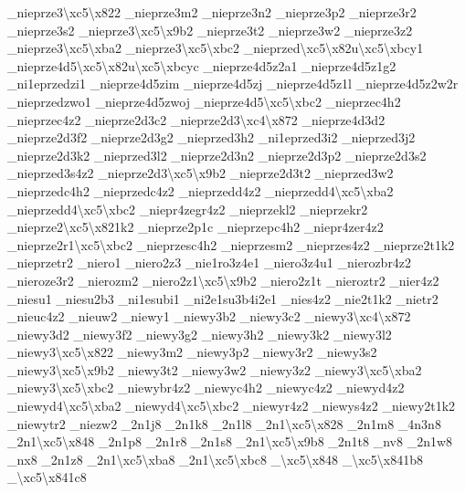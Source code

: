 {\-\_\-nieprze3\textbackslash{}xc5\textbackslash{}x822 \-\_\-nieprze3m2 \-\_\-nieprze3n2 \-\_\-nieprze3p2 \-\_\-nieprze3r2 \-\_\-nieprze3s2 \-\_\-nieprze3\textbackslash{}xc5\textbackslash{}x9b2 \-\_\-nieprze3t2 \-\_\-nieprze3w2 \-\_\-nieprze3z2 \-\_\-nieprze3\textbackslash{}xc5\textbackslash{}xba2 \-\_\-nieprze3\textbackslash{}xc5\textbackslash{}xbc2 \-\_\-nieprzed\textbackslash{}xc5\textbackslash{}x82u\textbackslash{}xc5\textbackslash{}xbcy1 \-\_\-nieprze4d5\textbackslash{}xc5\textbackslash{}x82u\textbackslash{}xc5\textbackslash{}xbcyc \-\_\-nieprze4d5z2a1 \-\_\-nieprze4d5z1g2 \-\_\-ni1eprzedzi1 \-\_\-nieprze4d5zim \-\_\-nieprze4d5zj \-\_\-nieprze4d5z1l \-\_\-nieprze4d5z2w2r \-\_\-nieprzedzwo1 \-\_\-nieprze4d5zwoj \-\_\-nieprze4d5\textbackslash{}xc5\textbackslash{}xbc2 \-\_\-nieprzec4h2 \-\_\-nieprzec4z2 \-\_\-nieprze2d3c2 \-\_\-nieprze2d3\textbackslash{}xc4\textbackslash{}x872 \-\_\-nieprze4d3d2 \-\_\-nieprze2d3f2 \-\_\-nieprze2d3g2 \-\_\-nieprzed3h2 \-\_\-ni1eprzed3i2 \-\_\-nieprzed3j2 \-\_\-nieprze2d3k2 \-\_\-nieprzed3l2 \-\_\-nieprze2d3n2 \-\_\-nieprze2d3p2 \-\_\-nieprze2d3s2 \-\_\-nieprzed3s4z2 \-\_\-nieprze2d3\textbackslash{}xc5\textbackslash{}x9b2 \-\_\-nieprze2d3t2 \-\_\-nieprzed3w2 \-\_\-nieprzedc4h2 \-\_\-nieprzedc4z2 \-\_\-nieprzedd4z2 \-\_\-nieprzedd4\textbackslash{}xc5\textbackslash{}xba2 \-\_\-nieprzedd4\textbackslash{}xc5\textbackslash{}xbc2 \-\_\-niepr4zegr4z2 \-\_\-nieprzekl2 \-\_\-nieprzekr2 \-\_\-nieprze2\textbackslash{}xc5\textbackslash{}x821k2 \-\_\-nieprze2p1c \-\_\-nieprzepc4h2 \-\_\-niepr4zer4z2 \-\_\-nieprze2r1\textbackslash{}xc5\textbackslash{}xbc2 \-\_\-nieprzesc4h2 \-\_\-nieprzesm2 \-\_\-nieprzes4z2 \-\_\-nieprze2t1k2 \-\_\-nieprzetr2 \-\_\-niero1 \-\_\-niero2z3 \-\_\-nie1ro3z4e1 \-\_\-niero3z4u1 \-\_\-nierozbr4z2 \-\_\-nieroze3r2 \-\_\-nierozm2 \-\_\-niero2z1\textbackslash{}xc5\textbackslash{}x9b2 \-\_\-niero2z1t \-\_\-nieroztr2 \-\_\-nier4z2 \-\_\-niesu1 \-\_\-niesu2b3 \-\_\-ni1esubi1 \-\_\-ni2e1su3b4i2e1 \-\_\-nies4z2 \-\_\-nie2t1k2 \-\_\-nietr2 \-\_\-nieuc4z2 \-\_\-nieuw2 \-\_\-niewy1 \-\_\-niewy3b2 \-\_\-niewy3c2 \-\_\-niewy3\textbackslash{}xc4\textbackslash{}x872 \-\_\-niewy3d2 \-\_\-niewy3f2 \-\_\-niewy3g2 \-\_\-niewy3h2 \-\_\-niewy3k2 \-\_\-niewy3l2 \-\_\-niewy3\textbackslash{}xc5\textbackslash{}x822 \-\_\-niewy3m2 \-\_\-niewy3p2 \-\_\-niewy3r2 \-\_\-niewy3s2 \-\_\-niewy3\textbackslash{}xc5\textbackslash{}x9b2 \-\_\-niewy3t2 \-\_\-niewy3w2 \-\_\-niewy3z2 \-\_\-niewy3\textbackslash{}xc5\textbackslash{}xba2 \-\_\-niewy3\textbackslash{}xc5\textbackslash{}xbc2 \-\_\-niewybr4z2 \-\_\-niewyc4h2 \-\_\-niewyc4z2 \-\_\-niewyd4z2 \-\_\-niewyd4\textbackslash{}xc5\textbackslash{}xba2 \-\_\-niewyd4\textbackslash{}xc5\textbackslash{}xbc2 \-\_\-niewyr4z2 \-\_\-niewys4z2 \-\_\-niewy2t1k2 \-\_\-niewytr2 \-\_\-niezw2 \-\_\-2n1j8 \-\_\-2n1k8 \-\_\-2n1l8 \-\_\-2n1\textbackslash{}xc5\textbackslash{}x828 \-\_\-2n1m8 \-\_\-4n3n8 \-\_\-2n1\textbackslash{}xc5\textbackslash{}x848 \-\_\-2n1p8 \-\_\-2n1r8 \-\_\-2n1s8 \-\_\-2n1\textbackslash{}xc5\textbackslash{}x9b8 \-\_\-2n1t8 \-\_\-nv8 \-\_\-2n1w8 \-\_\-nx8 \-\_\-2n1z8 \-\_\-2n1\textbackslash{}xc5\textbackslash{}xba8 \-\_\-2n1\textbackslash{}xc5\textbackslash{}xbc8 \-\_\-\textbackslash{}xc5\textbackslash{}x848 \-\_\textbackslash{}xc5\textbackslash{}x841b8 \-\_\textbackslash{}xc5\textbackslash{}x841c8 }
